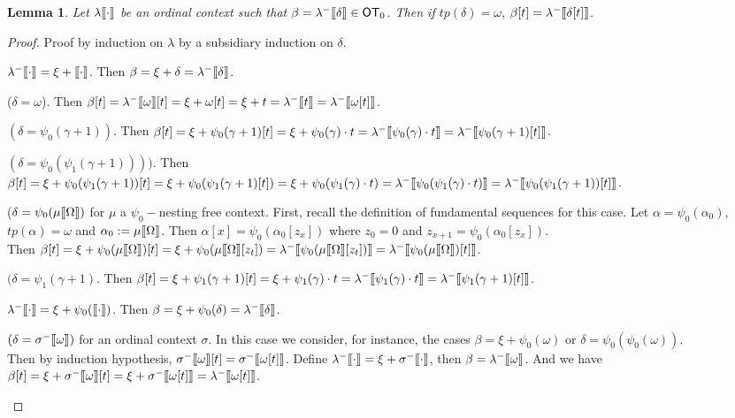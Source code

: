 \documentclass{amsart}
\theoremstyle{plain}
\theoremstyle{plain}
\newtheorem{lemma}[theorem]{Lemma}
\def\scbrl{[\hspace{-.14em}[}
\def\scbrr{]\hspace{-.14em}]}
\def\scbr#1{\scbrl#1\scbrr}
\newcommand\OT{\mathsf{OT}}
\newcommand{\Om}{{\Omega}}
\newcommand{\al}{{\alpha}}
\newcommand{\be}{{\beta}}
\newcommand{\ga}{\gamma}
\newcommand{\de}{\delta}
\newcommand{\la}{\lambda}
\newcommand{\om}{\omega}
\def\scbrl{[\hspace{-.14em}[}
\def\scbrr{]\hspace{-.14em}]}
\def\scbr#1{\scbrl#1\scbrr}
\begin{document}
\begin{lemma} \label{lm:fundamOrd}
Let $\la\scbr{\cdot}$ be an ordinal context such that $\be = \la^-\scbr{\de} \in \OT_0$.
Then if $tp(\de) = \om$, $\be[t] = \la^-\scbr{\de[t]}$.
\end{lemma}

\begin{proof} 
Proof by induction on $\la$ by a subsidiary induction on $\de$.
\begin{Cases}
\item $\la^-\scbr{\cdot} =\xi + \scbr{\cdot}$. Then $\be=\xi+\de=\la^-\scbr{\de}$.

\begin{Cases}
\item ($\de=\om$). Then $\be[t]=\la^-\scbr{\om}[t] = \xi + \om[t]= \xi+t=\la^-\scbr{t} = \la^-\scbr{\om[t]}$.\medskip

\item $(\de = \psi_0(\ga+1))$. \label{case:psi0 lm:fundamOrd}
Then $\be[t] = \xi + \psi_0(\ga+1)[t] = \xi+ \psi_0(\ga)\cdot t = \la^-\scbr{\psi_0(\ga)\cdot t} = \la^-\scbr{\psi_0(\ga+1)[t]}$.\medskip


\item $(\de = \psi_0(\psi_1(\ga+1)))).$ \label{case:psi1 lm:fundamOrd}
Then $\be[t] = \xi + \psi_0(\psi_1(\ga+1))[t] = \xi+ \psi_0(\psi_1(\ga+1)[t]) = 
\xi+ \psi_0(\psi_1(\ga) \cdot t) = \la^-\scbr{\psi_0(\psi_1(\ga)\cdot t)} = \la^-\scbr{\psi_0(\psi_1(\ga+1))[t]}$.\medskip


\item ($\de= \psi_0(\mu\scbr{\Om})$ for $\mu$ a $\psi_0-$nesting free context. First, recall the definition of fundamental sequences for this case. 
Let $\al= \psi_0(\al_0)$,  $tp(\al) =\om$ and $\al_0 :=\mu\scbr{\Om}$. 
Then $\al[x] = \psi_0(\al_0[z_x])$  where $z_0= 0$ and $z_{x+1} = \psi_0(\al_0[z_{x}])$.
\\
Then $\be[t] = \xi+ \psi_0(\mu\scbr{\Om})[t] = \xi+\psi_0(\mu\scbr{\Om}[z_t]) = \la^-\scbr{\psi_0(\mu\scbr{\Om}[z_t])}  = \la^-\scbr{\psi_0(\mu\scbr{\Om})[t]}$.\medskip


\item $(\de= \psi_1(\ga+1)$. 
Then $\be[t] = \xi + \psi_1(\ga+1)[t] = \xi+ \psi_1(\ga)\cdot t = \la^-\scbr{\psi_1(\ga)\cdot t} = \la^-\scbr{\psi_1(\ga+1)[t]}$.\medskip

\end{Cases}

\item $\la^-\scbr{\cdot} =\xi + \psi_0(\scbr{\cdot})$. Then $\be=\xi+\psi_0(\de) = \la^-\scbr{\de}$.
\begin{Cases}
\item  $(\de = \sigma^-\scbr{\om})$ for an ordinal context $\sigma$.
In this case we consider, for instance, the cases $\be=\xi+\psi_0(\om)$ or $\de= \psi_0(\psi_0(\om))$.
\\
Then by induction hypothesis, $\sigma^-\scbr{\om}[t] =\sigma^-\scbr{\om[t]}$.
Define $\la^-\scbr{\cdot} = \xi +\sigma^-\scbr{\cdot}$, then $\be=\la^-\scbr{\om}$.
And we have $\be[t] = \xi +\sigma^-\scbr{\om}[t] = \xi + \sigma^-\scbr{\om[t]} = \la^-\scbr{\om[t]}$.\medskip



\end{Cases}
\end{Cases}
\end{proof}
\end{document}
